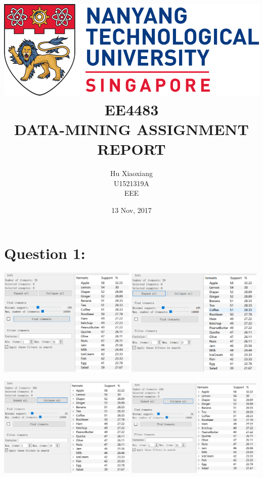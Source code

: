 \documentclass[titlepage]{article}
\author{Hu Xiaoxiang \\
U1521319A \\
EEE \\
}
\date{13 Nov, 2017 \\
}
\title{\includegraphics[width=\textwidth]{logo_ntu_new.png} \\
[5\baselineskip] EE4483 \\
DATA-MINING ASSIGNMENT \\
REPORT \\
[5\baselineskip]}
\begin{document}
\maketitle
\tableofcontents

\newpage
{}

\section{Question 1:}
\label{sec:org81bd7ad}
\begin{center}
\includegraphics[width=0.49\textwidth]{minsup20.png}
\includegraphics[width=0.49\textwidth]{minsup10.png}
\end{center}

\begin{center}
\includegraphics[width=0.49\textwidth]{minsup5.png}
\includegraphics[width=0.49\textwidth]{minsup3.png}
\end{center}
\end{document}
